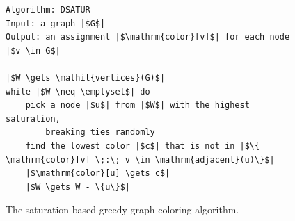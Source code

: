 \documentclass[11pt]{book}
\begin{document}
\begin{figure}[btp]
  \centering
\begin{lstlisting}[basicstyle=\rmfamily,deletekeywords={for,from,with,is,not,in,find},morekeywords={while},columns=fullflexible]
Algorithm: DSATUR
Input: a graph |$G$|
Output: an assignment |$\mathrm{color}[v]$| for each node |$v \in G$|

|$W \gets \mathit{vertices}(G)$|
while |$W \neq \emptyset$| do
    pick a node |$u$| from |$W$| with the highest saturation,
        breaking ties randomly
    find the lowest color |$c$| that is not in |$\{ \mathrm{color}[v] \;:\; v \in \mathrm{adjacent}(u)\}$|
    |$\mathrm{color}[u] \gets c$|
    |$W \gets W - \{u\}$|
\end{lstlisting}
  \caption{The saturation-based greedy graph coloring algorithm.}
  \label{fig:satur-algo}
\end{figure}
\end{document}
